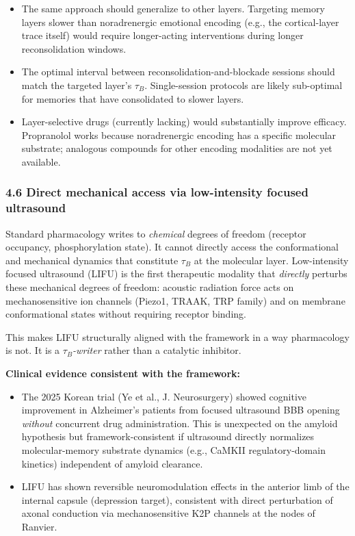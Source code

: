 \documentclass[
]{article}
\providecommand{\tightlist}{%
  \setlength{\itemsep}{0pt}\setlength{\parskip}{0pt}}
\begin{document}
\begin{itemize}
\tightlist
\item
  The same approach should generalize to other layers. Targeting memory
  layers slower than noradrenergic emotional encoding (e.g., the
  cortical-layer trace itself) would require longer-acting interventions
  during longer reconsolidation windows.
\item
  The optimal interval between reconsolidation-and-blockade sessions
  should match the targeted layer's \(\tau_B\). Single-session protocols
  are likely sub-optimal for memories that have consolidated to slower
  layers.
\item
  Layer-selective drugs (currently lacking) would substantially improve
  efficacy. Propranolol works because noradrenergic encoding has a
  specific molecular substrate; analogous compounds for other encoding
  modalities are not yet available.
\end{itemize}

\hypertarget{direct-mechanical-access-via-low-intensity-focused-ultrasound}{%
\subsubsection{4.6 Direct mechanical access via low-intensity focused
ultrasound}\label{direct-mechanical-access-via-low-intensity-focused-ultrasound}}

Standard pharmacology writes to \emph{chemical} degrees of freedom
(receptor occupancy, phosphorylation state). It cannot directly access
the conformational and mechanical dynamics that constitute \(\tau_B\) at
the molecular layer. Low-intensity focused ultrasound (LIFU) is the
first therapeutic modality that \emph{directly} perturbs these
mechanical degrees of freedom: acoustic radiation force acts on
mechanosensitive ion channels (Piezo1, TRAAK, TRP family) and on
membrane conformational states without requiring receptor binding.

This makes LIFU structurally aligned with the framework in a way
pharmacology is not. It is a \emph{\(\tau_B\)-writer} rather than a
catalytic inhibitor.

\textbf{Clinical evidence consistent with the framework:}

\begin{itemize}
\tightlist
\item
  The 2025 Korean trial (Ye et al., J. Neurosurgery) showed cognitive
  improvement in Alzheimer's patients from focused ultrasound BBB
  opening \emph{without} concurrent drug administration. This is
  unexpected on the amyloid hypothesis but framework-consistent if
  ultrasound directly normalizes molecular-memory substrate dynamics
  (e.g., CaMKII regulatory-domain kinetics) independent of amyloid
  clearance.
\item
  LIFU has shown reversible neuromodulation effects in the anterior limb
  of the internal capsule (depression target), consistent with direct
  perturbation of axonal conduction via mechanosensitive K2P channels at
  the nodes of Ranvier.
\end{itemize}
\end{document}
